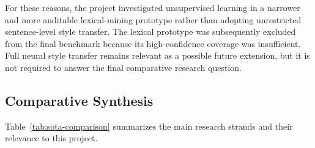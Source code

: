 \documentclass[12pt, a4paper, twoside, openany]{report}
\begin{document}
For these reasons, the project investigated unsupervised learning in a narrower and more auditable lexical-mining prototype rather than adopting unrestricted sentence-level style transfer. The lexical prototype was subsequently excluded from the final benchmark because its high-confidence coverage was insufficient. Full neural style transfer remains relevant as a possible future extension, but it is not required to answer the final comparative research question.


\subsection{Comparative Synthesis}

Table~\ref{tab:sota-comparison} summarizes the main research strands and their relevance to this project.
\end{document}
